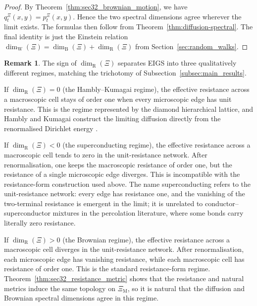 \documentclass{article}
\theoremstyle{plain}
\theoremstyle{definition}
\newtheorem{remark}[theorem]{Remark}
\newcommand{\dimbox}{\dim_\mathrm{B}}
\newcommand{\dimwalk}{\dim_\mathrm{W}}
\newcommand{\dimresis}{\dim_\mathrm{R}}
\begin{document}
\begin{proof}
By Theorem~\ref{thm:sec32_brownian_motion}, we have $q_t^\Xi(x,y)=p_t^\Xi(x,y)$.
Hence the two spectral dimensions agree wherever the limit exists.
The formulas then follow from Theorem~\ref{thm:diffusion-spectral}.
The final identity is just the Einstein relation $\dimwalk(\Xi)=\dimbox(\Xi)+\dimresis(\Xi)$ from Section~\ref{sec:random_walks}.
\end{proof}

\begin{remark}\label{rem:three_resistance_regimes}
The sign of $\dimresis(\Xi)$ separates EIGS into three qualitatively different regimes, matching the trichotomy of Subsection~\ref{subsec:main_results}.

If $\dimresis(\Xi)=0$ (the Hambly--Kumagai regime), the effective resistance across a macroscopic cell stays of order one when every microscopic edge has unit resistance.
This is the regime represented by the diamond hierarchical lattice, and Hambly and Kumagai construct the limiting diffusion directly from the renormalised Dirichlet energy \cite{hambly2010diffusion}.

If $\dimresis(\Xi)<0$ (the superconducting regime), the effective resistance across a macroscopic cell tends to zero in the unit-resistance network.
After renormalisation, one keeps the macroscopic resistance of order one, but the resistance of a single microscopic edge diverges.
This is incompatible with the resistance-form construction used above.
The name superconducting refers to the unit-resistance network: every edge has resistance one, and the vanishing of the two-terminal resistance is emergent in the limit; it is unrelated to conductor--superconductor mixtures in the percolation literature, where some bonds carry literally zero resistance.

If $\dimresis(\Xi)>0$ (the Brownian regime), the effective resistance across a macroscopic cell diverges in the unit-resistance network.
After renormalisation, each microscopic edge has vanishing resistance, while each macroscopic cell has resistance of order one.
This is the standard resistance-form regime.
Theorem~\ref{thm:sec32_resistance_metric} shows that the resistance and natural metrics induce the same topology on $\Xi_{\mathrm M}$, so it is natural that the diffusion and Brownian spectral dimensions agree in this regime.
\end{remark}
\end{document}
